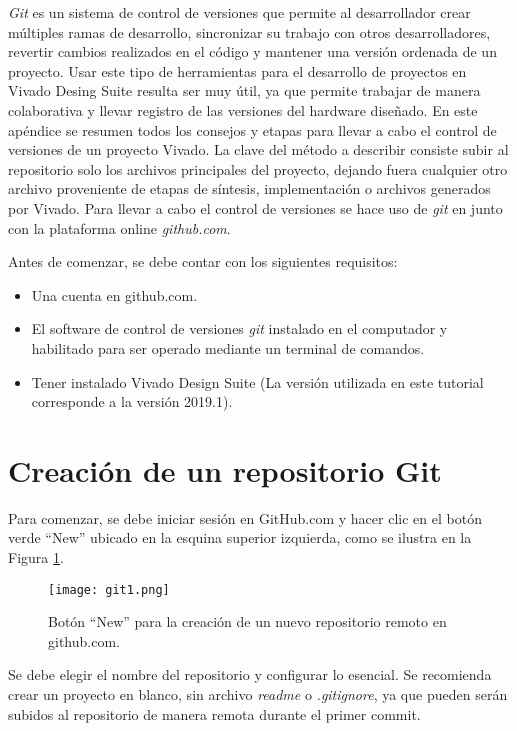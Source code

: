 \textit{Git} es un sistema de control de versiones que permite al desarrollador crear múltiples ramas de desarrollo, sincronizar su trabajo con otros desarrolladores, revertir cambios realizados en el código y mantener una versión ordenada de un proyecto. Usar este tipo de herramientas para el desarrollo de proyectos en Vivado Desing Suite resulta ser muy útil, ya que permite trabajar de manera colaborativa y llevar registro de las versiones del hardware diseñado. En este apéndice se resumen todos los consejos y etapas para llevar a cabo el control de versiones de un proyecto Vivado. La clave del método a describir consiste subir al repositorio solo los archivos principales del proyecto, dejando fuera cualquier otro archivo proveniente de etapas de síntesis, implementación o archivos generados por Vivado. Para llevar a cabo el control de versiones se hace uso de \textit{git} en junto con la plataforma online \textit{github.com}.

Antes de comenzar, se debe contar con los siguientes requisitos:
\begin{itemize}
	\item Una cuenta en github.com.
	\item El software de control de versiones \textit{git} instalado en el computador y habilitado para ser operado mediante un terminal de comandos.
	\item Tener instalado Vivado Design Suite (La versión utilizada en este tutorial corresponde a la versión 2019.1).
\end{itemize}

\section{Creación de un repositorio Git}

	Para comenzar, se debe iniciar sesión en GitHub.com y hacer clic en el botón verde  ``New'' ubicado en la esquina superior izquierda, como se ilustra en la Figura \ref{fig:git1}.
	
	\begin{figure}[ht]
		\centering
		\texttt{[image: git1.png]}
		\caption{Botón ``New'' para la creación de un nuevo repositorio remoto en github.com.}
		\label{fig:git1}
	\end{figure}
	
	Se debe elegir el nombre del repositorio y configurar lo esencial. Se recomienda crear un proyecto en blanco, sin archivo \textit{readme} o \textit{.gitignore}, ya que pueden serán subidos al repositorio de manera remota durante el primer commit.

